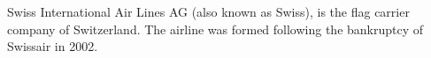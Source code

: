 Swiss International Air Lines AG (also known as Swiss), is the flag carrier company of Switzerland.
The airline was formed following the bankruptcy of Swissair in 2002.
